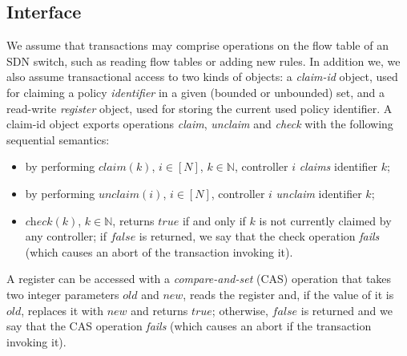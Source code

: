 \documentclass[conference]{sigcomm-alternate}
\newcommand{\Nat}{\mathbb{N}}
\begin{document}
\subsection{Interface}\label{sec:t-if}
We assume that transactions may comprise operations on the flow table
of an SDN switch, such as reading flow tables or adding new rules. 
In addition we, we also assume transactional access to  two kinds of objects: a
\emph{claim-id} object, used for claiming a policy \emph{identifier} in a
given (bounded or unbounded) set, and a read-write \emph{register}
object, used for storing the current used policy identifier.
%
A claim-id object exports operations \emph{claim},
\emph{unclaim} and \emph{check} with the following sequential
semantics:

\begin{itemize}
\item by performing $\textit{claim}(k)$, $i\in[N]$,
  $k\in\Nat$, controller $i$ \emph{claims} 
  identifier $k$;


\item by performing $\textit{unclaim}(i)$, $i\in[N]$, controller $i$
  \emph{unclaim} identifier $k$;  

\item $\textit{check}(k)$, $k\in\Nat$, returns $\textit{true}$ if and
  only if $k$ is not currently claimed by any controller; if
  $\textit{false}$ is returned, we say that the check operation
  \emph{fails} (which causes an abort of the transaction invoking it).

\end{itemize}  


A register can be accessed with a
\emph{compare-and-set} (CAS) operation that takes two integer parameters
$\textit{old}$ and $\textit{new}$, reads the register and, if the
value of it is $\textit{old}$, replaces it with $\textit{new}$ and
returns $\textit{true}$; otherwise, $\textit{false}$ is returned and
we say that the CAS operation \emph{fails} (which causes an abort if
the transaction invoking it).   
\end{document}

